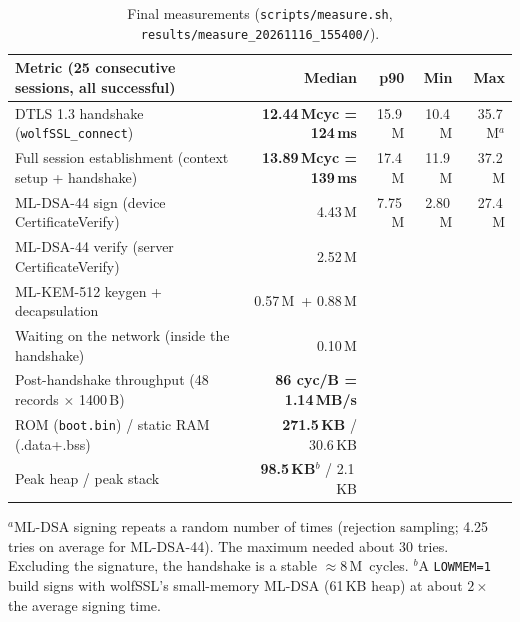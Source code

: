 \documentclass[10pt,a4paper]{article}
\newcommand{\M}{\,M}
\begin{document}
\begin{table}[h]
\centering\small
\begin{tabular}{@{}lrrrr@{}}
\toprule
Metric (25 consecutive sessions, all successful) & Median & p90 & Min & Max \\
\midrule
DTLS 1.3 handshake (\texttt{wolfSSL\_connect}) & \textbf{12.44\M cyc = 124\,ms} & 15.9\M & 10.4\M & 35.7\M$^{a}$ \\
Full session establishment (context setup + handshake) & \textbf{13.89\M cyc = 139\,ms} & 17.4\M & 11.9\M & 37.2\M \\
\quad ML-DSA-44 sign (device CertificateVerify) & 4.43\M & 7.75\M & 2.80\M & 27.4\M \\
\quad ML-DSA-44 verify (server CertificateVerify) & 2.52\M & & & \\
\quad ML-KEM-512 keygen + decapsulation & 0.57\M\ + 0.88\M & & & \\
\quad Waiting on the network (inside the handshake) & 0.10\M & & & \\
Post-handshake throughput (48 records $\times$ 1400\,B) & \textbf{86 cyc/B = 1.14\,MB/s} & & & \\
ROM (\texttt{boot.bin}) / static RAM (.data+.bss) & \textbf{271.5\,KB} / 30.6\,KB & & & \\
Peak heap / peak stack & \textbf{98.5\,KB}$^{b}$ / 2.1\,KB & & & \\
\bottomrule
\end{tabular}

\vspace{2pt}
\footnotesize $^{a}$ML-DSA signing repeats a random number of times (rejection sampling; 4.25 tries on average for
ML-DSA-44). The maximum needed about 30 tries. Excluding the signature, the handshake is a stable ${\approx}8$\M\ cycles.
$^{b}$A \texttt{LOWMEM=1} build signs with wolfSSL's small-memory ML-DSA (61\,KB heap) at about $2\times$ the average signing time.
\caption{Final measurements (\texttt{scripts/measure.sh}, \texttt{results/measure\_20261116\_155400/}).}
\end{table}
\end{document}
